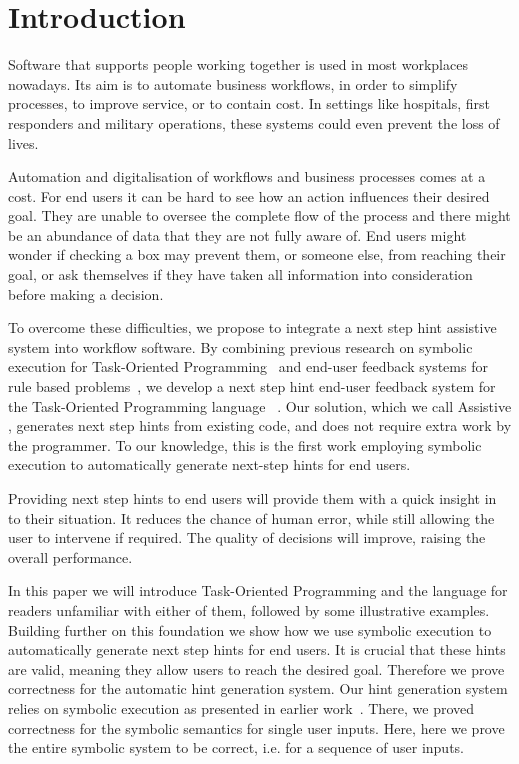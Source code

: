 
\section{Introduction}
\label{sec:intro}

Software that supports people working together is used in most workplaces nowadays.
Its aim is to automate business workflows, in order to simplify processes, to improve service, or to contain cost.
In settings like hospitals, first responders and military operations, these systems could even prevent the loss of lives.

Automation and digitalisation of workflows and business processes comes at a cost.
For end users it can be hard to see how an action influences their desired goal.
They are unable to oversee the complete flow of the process
and there might be an abundance of data that they are not fully aware of.
End users might wonder if checking a box may prevent them, or someone else, from reaching their goal,
or ask themselves if they have taken all information into consideration before making a decision.

To overcome these difficulties, we propose to integrate a next step hint assistive system into workflow software.
By combining previous research on symbolic execution for Task-Oriented Programming~\cite{Naus2019} and end-user feedback systems for rule based problems~\cite{DBLP:conf/sfp/NausJ16},
we develop a next step hint end-user feedback system for the Task-Oriented Programming language \TOPHAT~\cite{DBLP:conf/ppdp/SteenvoordenNK19}.
Our solution, which we call Assistive \TOPHAT, generates next step hints from existing code, and does not require extra work by the programmer.
To our knowledge, this is the first work employing symbolic execution to automatically generate next-step hints for end users.

Providing next step hints to end users will provide them with a quick insight in to their situation.
It reduces the chance of human error, while still allowing the user to intervene if required.
The quality of decisions will improve, raising the overall performance.

In this paper we will introduce Task-Oriented Programming and the \TOPHAT language for readers unfamiliar with either of them,
followed by some illustrative examples.
Building further on this foundation we show how we use symbolic execution to automatically generate next step hints for end users.
It is crucial that these hints are valid, meaning they allow users to reach the desired goal.
Therefore we prove correctness for the automatic hint generation system.
Our hint generation system relies on symbolic execution as presented in earlier work~\cite{Naus2019}.
There, we proved correctness for the symbolic semantics for single user inputs.
Here, here we prove the entire symbolic system to be correct, i.e. for a sequence of user inputs.


